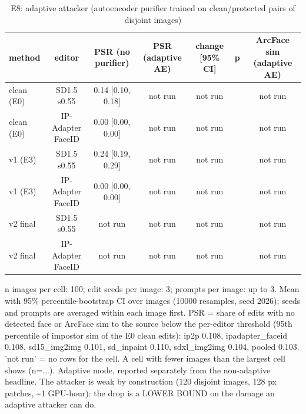 \begin{table}[t]
\centering
\small
\begin{tabular}{lcccccc}
\toprule
method & editor & PSR (no purifier) & PSR (adaptive AE) & change [95\% CI] & p & ArcFace sim (adaptive AE) \\
\midrule
clean (E0) & SD1.5 s0.55 & 0.14 [0.10, 0.18] & not run & not run &  & not run \\
clean (E0) & IP-Adapter FaceID & 0.00 [0.00, 0.00] & not run & not run &  & not run \\
v1 (E3) & SD1.5 s0.55 & 0.24 [0.19, 0.29] & not run & not run &  & not run \\
v1 (E3) & IP-Adapter FaceID & 0.00 [0.00, 0.00] & not run & not run &  & not run \\
v2 final & SD1.5 s0.55 & not run & not run & not run &  & not run \\
v2 final & IP-Adapter FaceID & not run & not run & not run &  & not run \\
\bottomrule
\end{tabular}
\caption{E8: adaptive attacker (autoencoder purifier trained on clean/protected pairs of disjoint images)}
\label{tab:e8}
\par\footnotesize n images per cell: 100; edit seeds per image: 3; prompts per image: up to 3. Mean with 95\% percentile-bootstrap CI over images (10000 resamples, seed 2026); seeds and prompts are averaged within each image first. PSR = share of edits with no detected face or ArcFace sim to the source below the per-editor threshold (95th percentile of impostor sim of the E0 clean edits): ip2p 0.108, ipadapter\_faceid 0.108, sd15\_img2img 0.101, sd\_inpaint 0.110, sdxl\_img2img 0.104, pooled 0.103. 'not run' = no rows for the cell. A cell with fewer images than the largest cell shows (n=...). Adaptive mode, reported separately from the non-adaptive headline. The attacker is weak by construction (120 disjoint images, 128 px patches, \textasciitilde{}1 GPU-hour): the drop is a LOWER BOUND on the damage an adaptive attacker can do.
\end{table}
